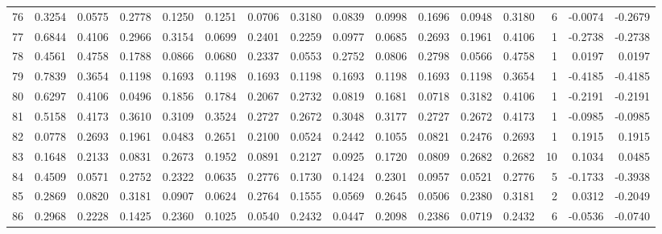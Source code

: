 \begin{tabular}{lrrrrrrrrrrrrrrr}
76  &      0.3254 &  0.0575 &  0.2778 &  0.1250 &  0.1251 &  0.0706 &  0.3180 &  0.0839 &  0.0998 &  0.1696 &   0.0948 &     0.3180 &      6 &                   -0.0074 &                    -0.2679 \\
77  &      0.6844 &  0.4106 &  0.2966 &  0.3154 &  0.0699 &  0.2401 &  0.2259 &  0.0977 &  0.0685 &  0.2693 &   0.1961 &     0.4106 &      1 &                   -0.2738 &                    -0.2738 \\
78  &      0.4561 &  0.4758 &  0.1788 &  0.0866 &  0.0680 &  0.2337 &  0.0553 &  0.2752 &  0.0806 &  0.2798 &   0.0566 &     0.4758 &      1 &                    0.0197 &                     0.0197 \\
79  &      0.7839 &  0.3654 &  0.1198 &  0.1693 &  0.1198 &  0.1693 &  0.1198 &  0.1693 &  0.1198 &  0.1693 &   0.1198 &     0.3654 &      1 &                   -0.4185 &                    -0.4185 \\
80  &      0.6297 &  0.4106 &  0.0496 &  0.1856 &  0.1784 &  0.2067 &  0.2732 &  0.0819 &  0.1681 &  0.0718 &   0.3182 &     0.4106 &      1 &                   -0.2191 &                    -0.2191 \\
81  &      0.5158 &  0.4173 &  0.3610 &  0.3109 &  0.3524 &  0.2727 &  0.2672 &  0.3048 &  0.3177 &  0.2727 &   0.2672 &     0.4173 &      1 &                   -0.0985 &                    -0.0985 \\
82  &      0.0778 &  0.2693 &  0.1961 &  0.0483 &  0.2651 &  0.2100 &  0.0524 &  0.2442 &  0.1055 &  0.0821 &   0.2476 &     0.2693 &      1 &                    0.1915 &                     0.1915 \\
83  &      0.1648 &  0.2133 &  0.0831 &  0.2673 &  0.1952 &  0.0891 &  0.2127 &  0.0925 &  0.1720 &  0.0809 &   0.2682 &     0.2682 &     10 &                    0.1034 &                     0.0485 \\
84  &      0.4509 &  0.0571 &  0.2752 &  0.2322 &  0.0635 &  0.2776 &  0.1730 &  0.1424 &  0.2301 &  0.0957 &   0.0521 &     0.2776 &      5 &                   -0.1733 &                    -0.3938 \\
85  &      0.2869 &  0.0820 &  0.3181 &  0.0907 &  0.0624 &  0.2764 &  0.1555 &  0.0569 &  0.2645 &  0.0506 &   0.2380 &     0.3181 &      2 &                    0.0312 &                    -0.2049 \\
86  &      0.2968 &  0.2228 &  0.1425 &  0.2360 &  0.1025 &  0.0540 &  0.2432 &  0.0447 &  0.2098 &  0.2386 &   0.0719 &     0.2432 &      6 &                   -0.0536 &                    -0.0740 \\

\end{tabular}
